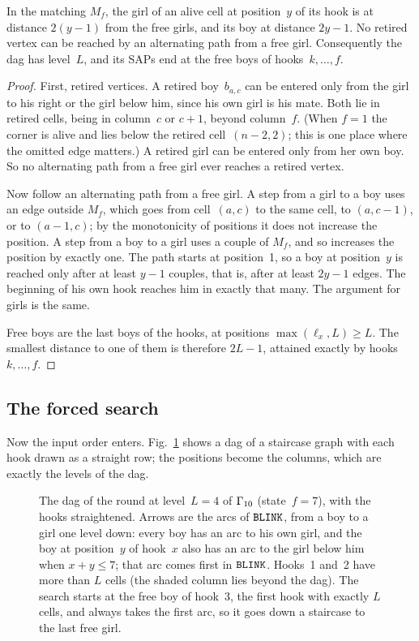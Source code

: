 \begin{lemma}
\label{lem:levels}
In the matching $M_f$, the girl of an alive cell at position~$y$ of its
hook is at distance $2(y-1)$ from the free girls, and its boy at distance
$2y-1$. No retired vertex can be reached by an alternating path from a
free girl. Consequently the dag has level~$L$, and its SAPs end at the
free boys of hooks~$k,\ldots,f$.
\end{lemma}

\begin{proof}
First, retired vertices. A retired boy~$b_{a,c}$ can be entered only from
the girl to his right or the girl below him, since his own girl is his
mate. Both lie in retired cells, being in column~$c$ or $c+1$, beyond
column~$f$. (When $f=1$ the corner is alive and lies below the retired
cell~$(n-2,2)$; this is one place where the omitted edge matters.) A
retired girl can be entered only from her own boy. So no alternating path
from a free girl ever reaches a retired vertex.

Now follow an alternating path from a free girl. A step from a girl to a
boy uses an edge outside $M_f$, which goes from cell~$(a,c)$ to the same
cell, to $(a,c-1)$, or to $(a-1,c)$; by the monotonicity of positions it
does not increase the position. A step from a boy to a girl uses a couple
of $M_f$, and so increases the position by exactly one. The path starts
at position~1, so a boy at position~$y$ is reached only after at least
$y-1$ couples, that is, after at least $2y-1$ edges. The beginning of his
own hook reaches him in exactly that many. The argument for girls is the
same.

Free boys are the last boys of the hooks, at positions $\max(\ell_x,L)\ge
L$. The smallest distance to one of them is therefore $2L-1$, attained
exactly by hooks~$k,\ldots,f$.
\end{proof}

\subsection{The forced search}

Now the input order enters. Fig.~\ref{fig:straight} shows a dag of a
staircase graph with each hook drawn as a straight row; the positions
become the columns, which are exactly the levels of the dag.

\begin{figure}[ht]
\centering

\caption{The dag of the round at level~$L=4$ of $\Gamma_{10}$ (state~$f=7$),
with the hooks straightened. Arrows are the arcs of $\texttt{BLINK}$, from a
boy to a girl one level down: every boy has an arc to his own girl, and
the boy at position~$y$ of hook~$x$ also has an arc to the girl below him
when $x+y\le7$; that arc comes first in $\texttt{BLINK}$. Hooks~1 and~2 have
more than $L$ cells (the shaded column lies beyond the dag). The search
starts at the free boy of hook~3, the first hook with exactly $L$ cells,
and always takes the first arc, so it goes down a staircase to the last
free girl.}
\label{fig:straight}
\end{figure}

